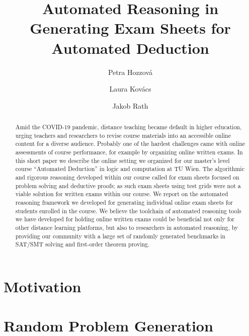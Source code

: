 \documentclass[12pt]{llncs}
\title{Automated Reasoning in Generating Exam Sheets for Automated Deduction}
\author{Petra Hozzov\'a\and
Laura Kov\'acs \and
Jakob Rath}
\institute{
    TU Wien, Austria
}
\begin{document}
\maketitle





\begin{abstract}
Amid the COVID-19 pandemic, distance teaching became default in higher education,
urging teachers and researchers to revise course materials into an 
accessible online content for a diverse audience. Probably one of the hardest challenges %
came with online assessments of course performance, for example by
organizing online written exams. 
In this short paper we describe the online 
setting  we organized for our master's level course ``Automated
Deduction'' in logic and computation at TU Wien.
The algorithmic and rigorous reasoning developed within our
course called for exam sheets focused on problem solving and deductive
proofs; as such exam sheets using test grids were not a viable solution
for written exams within our course.
We report on the automated reasoning framework we developed for generating individual online exam sheets for students enrolled in the course.
We believe the toolchain of automated reasoning tools we have developed for
holding online written exams could be beneficial not only for other
distance learning platforms, but also to researchers in automated
reasoning, by providing our community with a large set of randomly generated benchmarks in SAT/SMT solving and first-order theorem proving.
\end{abstract}





\section{Motivation}





%



\section{Random Problem Generation}\label{sec:satfo}
\end{document}

